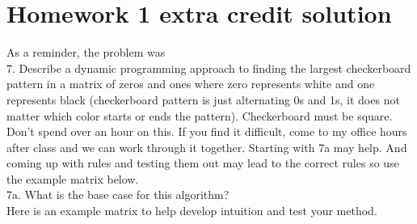 \documentclass[11pt]{article}
\begin{document}
\section*{Homework 1 extra credit solution}
As a reminder, the problem was  \\
7. Describe a dynamic programming approach to finding the largest checkerboard pattern in a matrix of zeros and ones where zero represents white and one represents black (checkerboard pattern is just alternating 0s and 1s, it does not matter which color starts or ends the pattern). Checkerboard must be square. Don't spend over an hour on this. If you find it difficult, come to my office hours after class and we can work through it together. Starting with 7a may help. And coming up with rules and testing them out may lead to the correct rules so use the example matrix below. \\

\noindent 7a. What is the base case for this algorithm?\\

\noindent Here is an example matrix to help develop intuition and test your method. \\

\noindent
{}
\end{document}
